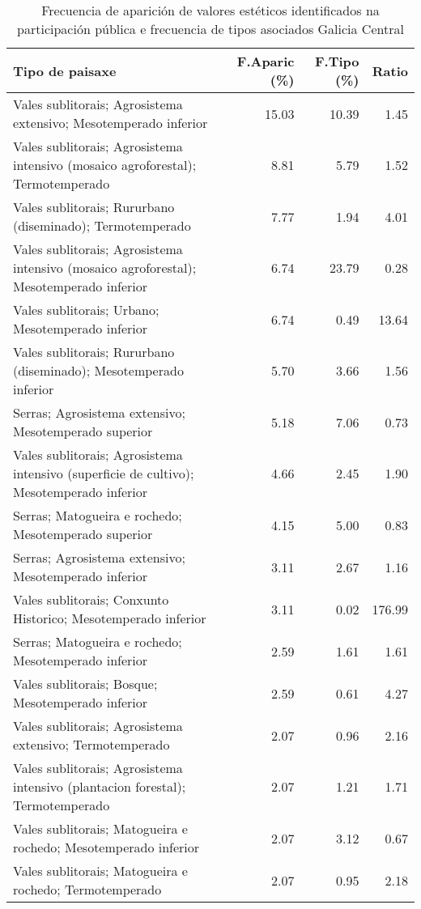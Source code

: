 \begin{table}[p]
\centering
\caption{Frecuencia de aparición de valores estéticos identificados na participación pública e frecuencia de tipos asociados Galicia Central} 
\label{vsixotest7}
\begin{tabular}{lrrr}
  \hline
Tipo de paisaxe & F.Aparic (\%) & F.Tipo (\%) & Ratio \\ 
  \hline
Vales sublitorais; Agrosistema extensivo; Mesotemperado inferior & 15.03 & 10.39 & 1.45 \\ 
  Vales sublitorais; Agrosistema intensivo (mosaico agroforestal); Termotemperado & 8.81 & 5.79 & 1.52 \\ 
  Vales sublitorais; Rururbano (diseminado); Termotemperado & 7.77 & 1.94 & 4.01 \\ 
  Vales sublitorais; Agrosistema intensivo (mosaico agroforestal); Mesotemperado inferior & 6.74 & 23.79 & 0.28 \\ 
  Vales sublitorais; Urbano; Mesotemperado inferior & 6.74 & 0.49 & 13.64 \\ 
  Vales sublitorais; Rururbano (diseminado); Mesotemperado inferior & 5.70 & 3.66 & 1.56 \\ 
  Serras; Agrosistema extensivo; Mesotemperado superior & 5.18 & 7.06 & 0.73 \\ 
  Vales sublitorais; Agrosistema intensivo (superficie de cultivo); Mesotemperado inferior & 4.66 & 2.45 & 1.90 \\ 
  Serras; Matogueira e rochedo; Mesotemperado superior & 4.15 & 5.00 & 0.83 \\ 
  Serras; Agrosistema extensivo; Mesotemperado inferior & 3.11 & 2.67 & 1.16 \\ 
  Vales sublitorais; Conxunto Historico; Mesotemperado inferior & 3.11 & 0.02 & 176.99 \\ 
  Serras; Matogueira e rochedo; Mesotemperado inferior & 2.59 & 1.61 & 1.61 \\ 
  Vales sublitorais; Bosque; Mesotemperado inferior & 2.59 & 0.61 & 4.27 \\ 
  Vales sublitorais; Agrosistema extensivo; Termotemperado & 2.07 & 0.96 & 2.16 \\ 
  Vales sublitorais; Agrosistema intensivo (plantacion forestal); Termotemperado & 2.07 & 1.21 & 1.71 \\ 
  Vales sublitorais; Matogueira e rochedo; Mesotemperado inferior & 2.07 & 3.12 & 0.67 \\ 
  Vales sublitorais; Matogueira e rochedo; Termotemperado & 2.07 & 0.95 & 2.18 \\ 

\end{tabular}
\end{table}
